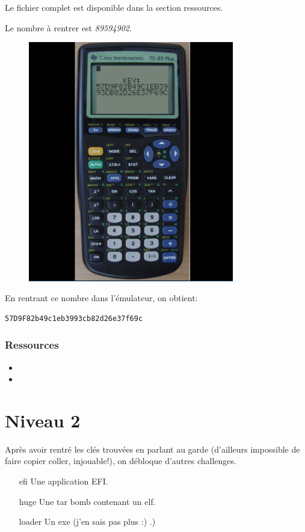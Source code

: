 \documentclass[14pt]{article}
\begin{document}
Le fichier complet est disponible dans la section ressources.

Le nombre à rentrer est {\em 89594902}.
\begin{figure}[H]
\includegraphics[width=0.8\textwidth]{./challs/calc/snapshot1.png}
\centering
\end{figure}

En rentrant ce nombre dans l'émulateur, on obtient: 
\begin{verbatim}
57D9F82b49c1eb3993cb82d26e37f69c
\end{verbatim}

\subsubsection{Ressources}
\begin{itemize}
\item {}
\item {}
\end{itemize}

\FloatBarrier
\section{Niveau 2}
Après avoir rentré les clés trouvées en parlant au garde (d'ailleurs impossible de faire copier coller, injouable!), on débloque d'autres challenges.
\begin{itemize}
\item[efi] Une application EFI.
\item[huge] Une tar bomb contenant un elf.
\item[loader] Un exe (j'en sais pas plus :) .)
\end{itemize}
\end{document}
